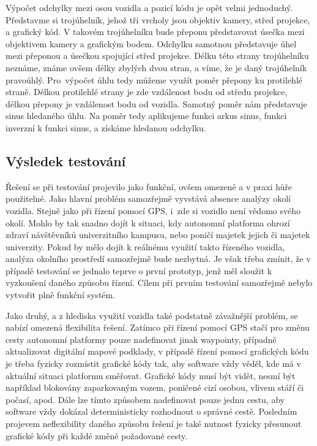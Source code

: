 \documentclass[czech, bachelor]{diploma}
\begin{document}
Výpočet odchylky mezi osou vozidla a pozicí kódu je opět velmi jednoduchý. Představme si trojúhelník, jehož tři vrcholy jsou
objektiv kamery, střed projekce, a grafický kód. V takovém trojúhelníku bude přeponu představovat úsečka mezi objektivem kamery
a grafickým bodem. Odchylku samotnou představuje úhel mezi přeponou a úsečkou spojující střed projekce. Délku této strany
trojúhelníku neznáme, známe ovšem délky zbylých dvou stran, a víme, že je daný trojúhelník pravoúhlý. Pro~výpočet úhlu tedy můžeme
využít poměr přepony ku protilehlé straně. Délkou protilehlé strany je zde vzdálenost bodu od středu projekce, délkou přepony
je vzdálenost bodu od vozidla. Samotný poměr nám představuje sinus hledaného úhlu. Na poměr tedy aplikujeme funkci arkus sinus,
funkci inverzní k funkci sinus, a získáme hledanou odchylku.

\subsection{Výsledek testování}

Řešení se při testování projevilo jako funkční, ovšem omezené a v praxi hůře použitelné. Jako hlavní problém samozřejmě vyvstává
absence analýzy okolí vozidla. Stejně jako při řízení pomocí GPS, i~zde si vozidlo není vědomo svého okolí. Mohlo by tak snadno
dojít k situaci, kdy autonomní platforma ohrozí zdraví návštěvníků univerzitního kampusu, nebo poničí majetek jejich či majetek
univerzity. Pokud by mělo dojít k reálnému využití takto řízeného vozidla, analýza okolního prostředí samozřejmě bude nezbytná.
Je však třeba zmínit, že v případě testování se jednalo teprve o první prototyp, jenž měl sloužit k vyzkoušení daného způsobu
řízení. Cílem při prvním testování samozřejmě nebylo vytvořit plně funkční systém.

Jako druhý, a z hlediska využití vozidla také podstatně závažnější problém, se nabízí omezená flexibilita řešení. Zatímco při
řízení pomocí GPS stačí pro změnu cesty autonomní platformy pouze nadefinovat jinak waypointy, případně aktualizovat digitální
mapové podklady, v případě řízení pomocí grafických kódu je třeba fyzicky rozmístit grafické kódy tak, aby software vždy věděl,
kde má v aktuální situaci platformu směřovat. Grafické kódy musí být vidět, nesmí být například blokovány zaparkovaným vozem,
poničené cizí osobou, vlivem stáří či počasí, apod. Dále lze tímto způsobem nadefinovat pouze jednu cestu, aby software vždy
dokázal deterministicky rozhodnout o správné cestě. Posledním projevem neflexibility daného způsobu řešení je také nutnost fyzicky
přesunout grafické kódy při každé změně požadované cesty.
\end{document}
